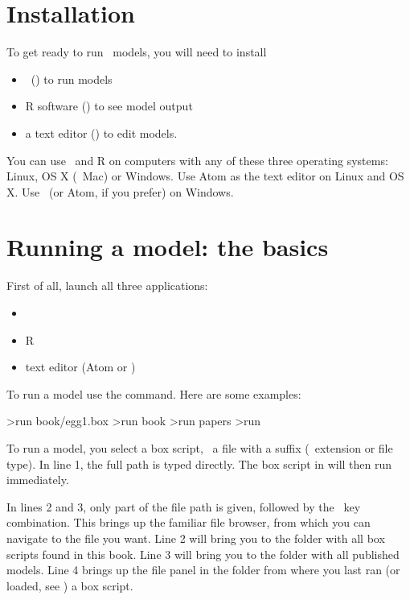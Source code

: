 \section{Installation}
To get ready to run \US\ models, you will need to install
\begin{itemize}
\item \US\ () to run models
\item R software () to see model output
\item a text editor () to edit models.
\end{itemize}
You can use \US\ and R on computers with any of these three operating systems: Linux, OS X (\eg\ Mac) or Windows. Use Atom as the text editor on Linux and OS X. Use \NPP\ (or Atom, if you prefer) on Windows.
                                         
\section{Running a model: the basics}
First of all, launch all three applications:
\begin{itemize}
\item \US\
\item R
\item text editor (Atom or \NPP)
\end{itemize}

To run a model use the  command. Here are some examples:
\lstset{numbers=left, escapechar=\%}
\begin{usdialog}
>run book/egg1.box
>run book %
>run papers %
>run %
\end{usdialog}
\lstset{numbers=none}

To run a model, you select a box script, \ie\ a file with a  suffix (\aka\ extension or file type). In line 1, the full path is typed directly. The box script in  will then run immediately.

In lines 2 and 3, only part of the file path is given, followed by the \autofillkey\ key combination. This brings up the familiar file browser, from which you can navigate to the file you want. Line 2 will bring you to the folder with all box scripts found in this book. Line 3 will bring you to the folder with all published models. Line 4 brings up the file panel in the folder from where you last ran (or loaded, see ) a box script.

